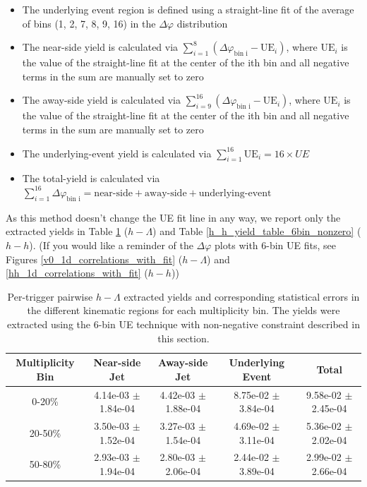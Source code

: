 \documentclass[ALICE,manyauthors]{ALICE_analysis_notes}
\begin{document}
\begin{itemize}
\item The underlying event region is defined using a straight-line fit of the average of bins (1, 2, 7, 8, 9, 16) in the $\Delta\varphi$ distribution
\item The near-side yield is calculated via $\sum_{i=1}^{8} (\Delta\varphi_\text{bin i} - \text{UE}_i)$, where $\text{UE}_i$ is the value of the straight-line fit at the center of the ith bin and all negative terms in the sum are manually set to zero
\item The away-side yield is calculated via $\sum_{i=9}^{16} (\Delta\varphi_\text{bin i} - \text{UE}_i)$, where $\text{UE}_i$ is the value of the straight-line fit at the center of the ith bin and all negative terms in the sum are manually set to zero
\item The underlying-event yield is calculated via $\sum_{i=1}^{16} \text{UE}_i = 16 \times UE$
\item The total-yield is calculated via $\sum_{i=1}^{16} \Delta\varphi_\text{bin i} = \text{near-side} + \text{away-side} + \text{underlying-event}$
\end{itemize}

As this method doesn't change the UE fit line in any way, we report only the extracted yields in Table \ref{h_lambda_yield_table_6bin_nonzero} ($h-\Lambda$) and Table \ref{h_h_yield_table_6bin_nonzero} ($h-h$). (If you would like a reminder of the $\Delta\varphi$ plots with 6-bin UE fits, see Figures \ref{v0_1d_correlations_with_fit} ($h-\Lambda$) and \ref{hh_1d_correlations_with_fit} ($h-h$))

	
\begin{table}[h!]
\centering
\begin{tabular}{| c | c | c | c | c | }
\hline
Multiplicity Bin & Near-side Jet & Away-side Jet & Underlying Event & Total  \\
\hline
	
0-20\% & 4.14e-03 $\pm$ 1.84e-04 & 4.42e-03 $\pm$ 1.88e-04 & 8.75e-02 $\pm$ 3.84e-04 & 9.58e-02 $\pm$ 2.45e-04 \\
20-50\% & 3.50e-03 $\pm$ 1.52e-04 & 3.27e-03 $\pm$ 1.54e-04 & 4.69e-02 $\pm$ 3.11e-04 & 5.36e-02 $\pm$ 2.02e-04 \\
50-80\% & 2.93e-03 $\pm$ 1.94e-04 & 2.80e-03 $\pm$ 2.06e-04 & 2.44e-02 $\pm$ 3.89e-04 & 2.99e-02 $\pm$ 2.66e-04 \\
	
\hline
\end{tabular}
\caption{Per-trigger pairwise $h-\Lambda$ extracted yields and corresponding statistical errors in the different kinematic regions for each multiplicity bin. The yields were extracted using the 6-bin UE technique with non-negative constraint described in this section.}
\label{h_lambda_yield_table_6bin_nonzero}
\end{table}
	
\end{document}
